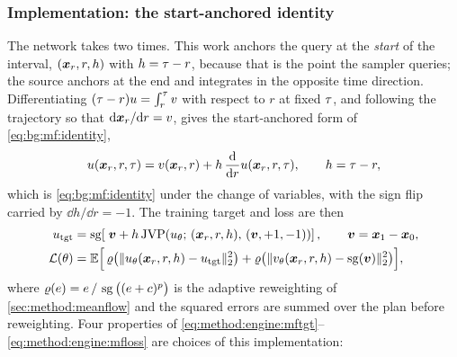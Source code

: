 \subsubsection*{Implementation: the start-anchored identity}

The network takes two times. This work anchors the query at the \emph{start} of the interval,
$(\boldsymbol{x}_{r},r,h)$ with $h=\tau-r$, because that is the point the sampler queries; the
source \parencite[Eq.~(6)]{geng2025meanflow} anchors at the end and integrates in the opposite time
direction. Differentiating $(\tau-r)u = \int_{r}^{\tau}v$ with respect to $r$ at
fixed $\tau$, and following the trajectory so that $\mathrm{d}\boldsymbol{x}_{r}/\mathrm{d} r = v$, gives the
start-anchored form of \eqref{eq:bg:mf:identity},
\begin{equation}\label{eq:method:engine:mfid}
  u(\boldsymbol{x}_{r},r,\tau)
  = v(\boldsymbol{x}_{r},r) + h\,\frac{\mathrm{d}}{\mathrm{d} r}u(\boldsymbol{x}_{r},r,\tau),
  \qquad h = \tau - r,
\end{equation}
which is \eqref{eq:bg:mf:identity} under the change of variables, with the sign flip carried by
$\dd h/\dd r = -1$. The training target and loss are then
\begin{align}
  u_{\textrm{tgt}}
    &= \operatorname{sg}\!\left[\;\boldsymbol{v} + h\,
       \mathrm{JVP}\!\left(u_{\theta};\,
         (\boldsymbol{x}_{r},r,h),\,(\boldsymbol{v},+1,-1)\right)\right],
       \qquad \boldsymbol{v} = \boldsymbol{x}_{1}-\boldsymbol{x}_{0},
       \label{eq:method:engine:mftgt}\\
  \mathcal{L}(\theta)
    &= \mathbb{E}\Big[\,
        \varrho\big(\|u_{\theta}(\boldsymbol{x}_{r},r,h) - u_{\textrm{tgt}}\|_{2}^{2}\big)
      + \varrho\big(\|v_{\theta}(\boldsymbol{x}_{r},r,h) - \operatorname{sg}(\boldsymbol{v})\|_{2}^{2}\big)\Big],
       \label{eq:method:engine:mfloss}
\end{align}
where $\varrho(e) = e\,/\,\operatorname{sg}\big((e+c)^{p}\big)$ is the adaptive reweighting of
\autoref{sec:method:meanflow} and the squared errors are summed over the plan before reweighting.
Four properties of \eqref{eq:method:engine:mftgt}--\eqref{eq:method:engine:mfloss} are choices of
this implementation:

